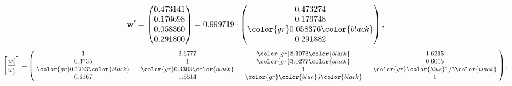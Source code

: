 \begin{example}
\begin{equation*}
\mathbf{w}^{\prime} =
\begin{pmatrix}
0.473141\\
0.176698\\
0.058360\\
0.291800
\end{pmatrix} =
0.999719\cdot
\begin{pmatrix}
0.473274\\
0.176748\\
\color{gr} 0.058376\color{black} \\
0.291882
\end{pmatrix},
\end{equation*}
\begin{equation*}
\left[ \frac{{w}^{\prime}_i}{{w}^{\prime}_j} \right] =
\begin{pmatrix}
$\,\,$ 1 $\,\,$ & $\,\,$2.6777$\,\,$ & $\,\,$\color{gr} 8.1073\color{black} $\,\,$ & $\,\,$1.6215$\,\,$ \\
$\,\,$0.3735$\,\,$ & $\,\,$ 1 $\,\,$ & $\,\,$\color{gr} 3.0277\color{black} $\,\,$ & $\,\,$0.6055  $\,\,$ \\
$\,\,$\color{gr} 0.1233\color{black} $\,\,$ & $\,\,$\color{gr} 0.3303\color{black} $\,\,$ & $\,\,$ 1 $\,\,$ & $\,\,$\color{gr} \color{blue}  1/5\color{black}  $\,\,$ \\
$\,\,$0.6167$\,\,$ & $\,\,$1.6514$\,\,$ & $\,\,$\color{gr} \color{blue} 5\color{black} $\,\,$ & $\,\,$ 1  $\,\,$ \\
\end{pmatrix},
\end{equation*}
\end{example}
\newpage

